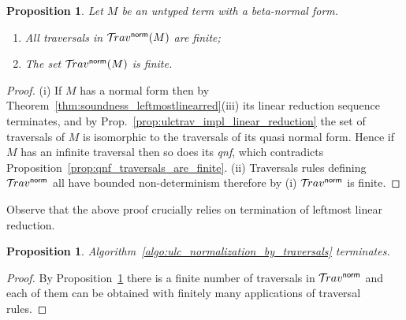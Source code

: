 \documentclass{article}
\theoremstyle{plain}
\newtheorem{proposition}[theorem]{Proposition}
\theoremstyle{definition}
\theoremstyle{remark}
\newcommand{\normalizing}{{\sf norm}}
\newcommand{\travsetnorm}{\travset^\normalizing}
\begin{document}
\begin{proposition}
\label{prop:ulc_travnorm_finite}
Let $M$ be an untyped term with a beta-normal form.
\begin{enumerate}[label=(\roman*)]
\item All traversals in $\travsetnorm(M)$ are finite;
\item The set $\travsetnorm(M)$ is finite.
\end{enumerate}
\end{proposition}
\begin{proof}
(i) If $M$ has a normal form then by Theorem~\ref{thm:soundness_leftmostlinearred}(iii) its linear reduction sequence terminates, and by Prop.~\ref{prop:ulctrav_impl_linear_reduction} the set of traversals of $M$ is isomorphic to the traversals of its quasi normal form. Hence if $M$ has an infinite traversal then so does its \emph{qnf}, which contradicts Proposition~\ref{prop:qnf_traversals_are_finite}.
(ii) Traversals rules defining $\travsetnorm$ all have bounded non-determinism therefore by (i) $\travsetnorm$ is finite.
\end{proof}
\begin{remarkbox}
Observe that the above proof crucially relies on termination of leftmost linear reduction.
\end{remarkbox}

\begin{proposition}
Algorithm~\ref{algo:ulc_normalization_by_traversals} terminates.
\end{proposition}
\begin{proof}
By Proposition~\ref{prop:ulc_travnorm_finite} there is a finite number of traversals in $\travsetnorm$ and each of them can be obtained with finitely many applications of traversal rules.
\end{proof}
\end{document}
